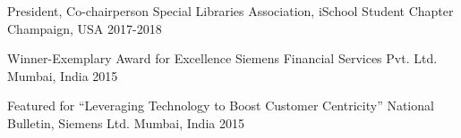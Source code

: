 {\vspace{-2mm}}

\begin{cvhonors}
  \cvhonor
    {President, Co-chairperson} %
    {Special Libraries Association, iSchool Student Chapter} %
    {Champaign, USA} %
    {2017-2018} %

    \cvhonor
    {Winner-Exemplary Award for Excellence} %
    {Siemens Financial Services Pvt. Ltd.} %
    {Mumbai, India} %
    {2015} %
    
    \cvhonor
    {Featured for “Leveraging Technology to Boost Customer Centricity”} %
    {National Bulletin, Siemens Ltd.} %
    {Mumbai, India} %
    {2015} %
\end{cvhonors}
\vspace{-4.0mm}